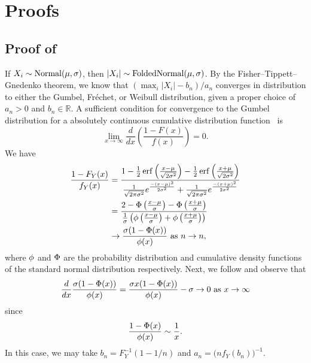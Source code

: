 \section{Proofs}

\subsection{Proof of }


If \(X_i \sim \operatorname{Normal}(\mu, \sigma)\), then \(|X_i| \sim \operatorname{FoldedNormal}(\mu,\sigma)\). By the
Fisher--Tippett--Gnedenko theorem, we know that \((\max_i |X_i| - b_n) / a_n\) converges in
distribution to either the Gumbel, Fréchet, or Weibull distribution, given a proper choice
of \(a_n > 0\) and \(b_n \in \mathbb{R}\). A sufficient condition for convergence to the
Gumbel distribution for a absolutely continuous cumulative distribution
function~\citep[Theorem 10.5.2]{nagaraja2003} is
\[
  \lim_{x \rightarrow \infty} \frac{d}{dx}\left(\frac{1- F(x)}{f(x)}\right) = 0.
\]
We have
\[
  \begin{aligned}
    \frac{1 - F_Y(x)}{f_Y(x)} & = \frac{1 - \frac{1}{2}\operatorname{erf}{\left(\frac{x - \mu}{\sqrt{2\sigma^2}}\right)} - \frac{1}{2}\operatorname{erf}{\left(\frac{x + \mu}{\sqrt{2\sigma^2}}\right)}}{\frac{1}{\sqrt{2\pi\sigma^2}}e^{\frac{-(x-\mu)^2}{2\sigma^2}} + \frac{1}{\sqrt{2\pi\sigma^2}}e^{\frac{-(x+\mu)^2}{2\sigma^2}}} \\
                              & = \frac{2 - \operatorname{\Phi}\left(\frac{x - \mu}{\sigma}\right) - \operatorname{\Phi}\left(\frac{x + \mu}{\sigma}\right)}{\frac{1}{\sigma}\left(\operatorname{\phi}\left(\frac{x - \mu}{\sigma}\right) + \operatorname{\phi}\left(\frac{x + \mu}{\sigma}\right)\right)}                                                              \\
                              & \rightarrow \frac{\sigma(1 - \operatorname{\Phi}(x))}{\operatorname{\phi}(x)} \text{ as } n \rightarrow n,
  \end{aligned}
\]
where \(\operatorname{\phi}\) and \(\operatorname{\Phi}\) are the probability distribution and cumulative density
functions of the standard normal distribution respectively. Next, we follow \citet[example
  10.5.3]{nagaraja2003} and observe that
\[
  \frac{d}{dx} \frac{\sigma(1 - \operatorname{\Phi}(x))}{\operatorname{\phi}(x)} = \frac{\sigma x (1 - \operatorname{\Phi}(x))}{\operatorname{\phi}(x)} - \sigma \rightarrow 0 \text{ as } x \rightarrow \infty
\]
since
\[
  \frac{1 - \operatorname{\Phi}(x)}{\operatorname{\phi}(x)} \sim \frac{1}{x}.
\]
In this case, we may take \(b_n = F_Y^{-1}(1 - 1/n)\) and \(a_n = \big(n
f_Y(b_n)\big)^{-1}\).

